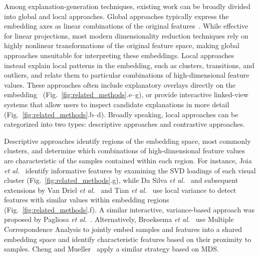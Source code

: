 \documentclass[lettersize,journal]{IEEEtran}
\newcommand{\etal}{\textit{et al.\xspace}}
\begin{document}
Among explanation-generation techniques, existing work can be broadly divided into global and local approaches.
Global approaches typically express the embedding axes as linear combinations of the original features~\cite{Broeksema2013,Coimbra2016}.
While effective for linear projections, most modern dimensionality reduction techniques rely on highly nonlinear transformations of the original feature space, making global approaches unsuitable for interpreting these embeddings.
Local approaches instead explain local patterns in the embedding, such as clusters, transitions, and outliers, and relate them to particular combinations of high-dimensional feature values.
These approaches often include explanatory overlays directly on the embedding~\cite{Joia2015,ChengMueller2016,Tian2021} (Fig.~\ref{fig:related_methods}.e--g), or provide interactive linked-view systems that allow users to inspect candidate explanations in more detail~\cite{Kandogan2012,Stahnke2016,Bibal2021} (Fig.~\ref{fig:related_methods}.b--d).
Broadly speaking, local approaches can be categorized into two types: descriptive approaches and contrastive approaches.

Descriptive approaches identify regions of the embedding space, most commonly clusters, and determine which combinations of high-dimensional feature values are characteristic of the samples contained within each region.
For instance, Joia \etal~\cite{Joia2015} identify informative features by examining the SVD loadings of each visual cluster (Fig.~\ref{fig:related_methods}.g), while Da Silva \etal~\cite{DaSilva2015} and subsequent extensions by Van Driel \etal~\cite{VanDriel2020} and Tian \etal~\cite{Tian2021} use local variance to detect features with similar values within embedding regions (Fig.~\ref{fig:related_methods}.f).
A similar interactive, variance-based approach was proposed by Pagliosa \etal~\cite{Pagliosa2016}.
Alternatively, Broeksema \etal~\cite{Broeksema2013} use Multiple Correspondence Analysis to jointly embed samples and features into a shared embedding space and identify characteristic features based on their proximity to samples. Cheng and Mueller~\cite{ChengMueller2016} apply a similar strategy based on MDS.
\end{document}
